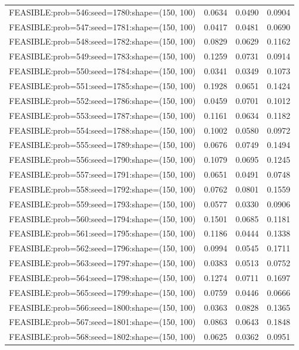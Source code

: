 \begin{longtable}{lccc}
FEASIBLE:prob=546:seed=1780:shape=(150, 100) & 0.0634 & 0.0490 & 0.0904 \\
FEASIBLE:prob=547:seed=1781:shape=(150, 100) & 0.0417 & 0.0481 & 0.0690 \\
FEASIBLE:prob=548:seed=1782:shape=(150, 100) & 0.0829 & 0.0629 & 0.1162 \\
FEASIBLE:prob=549:seed=1783:shape=(150, 100) & 0.1259 & 0.0731 & 0.0914 \\
FEASIBLE:prob=550:seed=1784:shape=(150, 100) & 0.0341 & 0.0349 & 0.1073 \\
FEASIBLE:prob=551:seed=1785:shape=(150, 100) & 0.1928 & 0.0651 & 0.1424 \\
FEASIBLE:prob=552:seed=1786:shape=(150, 100) & 0.0459 & 0.0701 & 0.1012 \\
FEASIBLE:prob=553:seed=1787:shape=(150, 100) & 0.1161 & 0.0634 & 0.1182 \\
FEASIBLE:prob=554:seed=1788:shape=(150, 100) & 0.1002 & 0.0580 & 0.0972 \\
FEASIBLE:prob=555:seed=1789:shape=(150, 100) & 0.0676 & 0.0749 & 0.1494 \\
FEASIBLE:prob=556:seed=1790:shape=(150, 100) & 0.1079 & 0.0695 & 0.1245 \\
FEASIBLE:prob=557:seed=1791:shape=(150, 100) & 0.0651 & 0.0491 & 0.0748 \\
FEASIBLE:prob=558:seed=1792:shape=(150, 100) & 0.0762 & 0.0801 & 0.1559 \\
FEASIBLE:prob=559:seed=1793:shape=(150, 100) & 0.0577 & 0.0330 & 0.0906 \\
FEASIBLE:prob=560:seed=1794:shape=(150, 100) & 0.1501 & 0.0685 & 0.1181 \\
FEASIBLE:prob=561:seed=1795:shape=(150, 100) & 0.1186 & 0.0444 & 0.1338 \\
FEASIBLE:prob=562:seed=1796:shape=(150, 100) & 0.0994 & 0.0545 & 0.1711 \\
FEASIBLE:prob=563:seed=1797:shape=(150, 100) & 0.0383 & 0.0513 & 0.0752 \\
FEASIBLE:prob=564:seed=1798:shape=(150, 100) & 0.1274 & 0.0711 & 0.1697 \\
FEASIBLE:prob=565:seed=1799:shape=(150, 100) & 0.0759 & 0.0446 & 0.0666 \\
FEASIBLE:prob=566:seed=1800:shape=(150, 100) & 0.0363 & 0.0828 & 0.1365 \\
FEASIBLE:prob=567:seed=1801:shape=(150, 100) & 0.0863 & 0.0643 & 0.1848 \\
FEASIBLE:prob=568:seed=1802:shape=(150, 100) & 0.0625 & 0.0362 & 0.0951 \\

\end{longtable}
